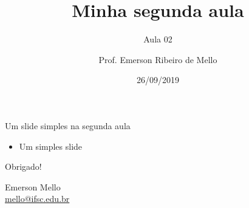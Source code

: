 \documentclass{beamer}
\title{Minha segunda aula}
\subtitle{Aula 02}
\author{Prof. Emerson Ribeiro de Mello}
\institute{
\href{mello@ifsc.edu.br}{mello@ifsc.edu.br}
}
\date{26/09/2019}
\begin{document}
 \begin{frame}[t]\maketitle\end{frame}





\begin{frame}[wide]{Um slide simples na segunda aula}
\begin{itemize}
    \item Um simples slide
\end{itemize}
\end{frame}


\begin{frame}{}
\vspace{2cm}
    \begin{center}
        \huge Obrigado!
    \end{center}
    \vspace{2cm}
    \begin{flushright}
    Emerson Mello \\ \url{mello@ifsc.edu.br}
    \end{flushright}
\end{frame}
\end{document}
